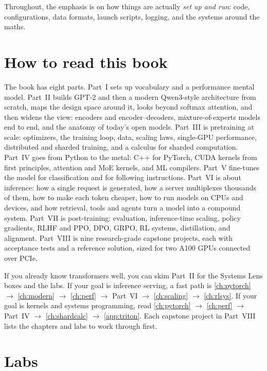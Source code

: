 Throughout, the emphasis is on how things are actually \emph{set up and run}: code,
configurations, data formats, launch scripts, logging, and the systems around the maths.

\section*{How to read this book}

The book has eight parts. Part~I sets up vocabulary and a performance mental model.
Part~II builds GPT-2 and then a modern Qwen3-style architecture from scratch, maps the design space
around it, looks beyond softmax attention, and then widens the view: encoders and encoder--decoders,
mixture-of-experts models end to end, and the anatomy of today's open models. Part~III is
pretraining at scale: optimizers, the training loop, data, scaling laws, single-GPU performance,
distributed and sharded training, and a calculus for sharded computation. Part~IV goes from Python
to the metal: C++ for PyTorch, CUDA kernels from first principles, attention and MoE kernels, and ML
compilers. Part~V fine-tunes the model for classification and for following instructions. Part~VI is
about inference: how a single request is generated, how a server multiplexes thousands of them, how
to make each token cheaper, how to run models on CPUs and devices, and how retrieval, tools and agents
turn a model into a compound system. Part~VII is post-training: evaluation, inference-time scaling,
policy gradients, RLHF and PPO, DPO, GRPO, RL systems, distillation, and alignment. Part~VIII is nine
research-grade capstone projects, each with acceptance tests and a reference solution, sized for two
A100 GPUs connected over PCIe.

If you already know transformers well, you can skim Part~II for the Systems Lens boxes and the
labs. If your goal is inference serving, a fast path is
\cref{ch:pytorch} $\rightarrow$ \cref{ch:modern} $\rightarrow$ \cref{ch:perf} $\rightarrow$
Part~VI $\rightarrow$ \cref{ch:scaling} $\rightarrow$ \cref{ch:rlsys}. If your goal is kernels and
systems programming, read \cref{ch:pytorch} $\rightarrow$ \cref{ch:perf} $\rightarrow$ Part~IV
$\rightarrow$ \cref{ch:shardcalc} $\rightarrow$ \cref{app:triton}. Each capstone project in
Part~VIII lists the chapters and labs to work through first.

\section*{Labs}

